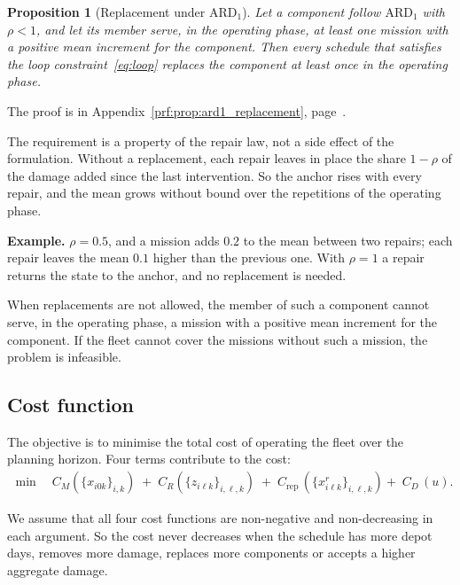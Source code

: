 \documentclass[11pt,a4paper]{article}
\theoremstyle{plain}
\newtheorem{proposition}[theorem]{Proposition}
\theoremstyle{definition}
\theoremstyle{remark}
\begin{document}
\begin{proposition}[Replacement under $\text{ARD}_1$]\label{prop:ard1_replacement}
Let a component follow $\text{ARD}_1$ with $\rho < 1$, and let its member serve, in the operating phase, at least one mission with a positive mean increment for the component.
Then every schedule that satisfies the loop constraint~\eqref{eq:loop} replaces the component at least once in the operating phase.
\end{proposition}
The proof is in Appendix~\ref{prf:prop:ard1_replacement}, page~\pageref{prf:prop:ard1_replacement}.

The requirement is a property of the repair law, not a side effect of the formulation.
Without a replacement, each repair leaves in place the share $1-\rho$ of the damage added since the last intervention.
So the anchor rises with every repair, and the mean grows without bound over the repetitions of the operating phase.

\begin{examplebox}
\textbf{Example.} $\rho = 0.5$, and a mission adds $0.2$ to the mean between two repairs; each repair leaves the mean $0.1$ higher than the previous one.
With $\rho = 1$ a repair returns the state to the anchor, and no replacement is needed.
\end{examplebox}

When replacements are not allowed, the member of such a component cannot serve, in the operating phase, a mission with a positive mean increment for the component.
If the fleet cannot cover the missions without such a mission, the problem is infeasible.

\subsection{Cost function}
\label{sec:cost_function}

The objective is to minimise the total cost of operating the fleet over the planning horizon.
Four terms contribute to the cost:
\begin{align}\label{eq:objective}
\min \quad
  C_M \left(\{x_{i0k}\}_{i,k}\right)
  \;+\; C_{R} \left(\{z_{i\ell k}\}_{i,\ell,k}\right)
  \;+\; C_{\mathrm{rep}}\, (\{x^r_{i\ell k}\}_{i,\ell,k}) +\; C_D\,(u).
\end{align}

We assume that all four cost functions are non-negative and non-decreasing in each argument.
So the cost never decreases when the schedule has more depot days, removes more damage, replaces more components or accepts a higher aggregate damage.
\end{document}
